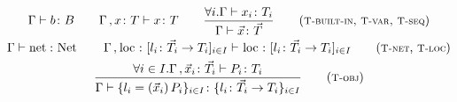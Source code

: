 \begin{myfigure}
  \begin{gather*}
    \Gamma \type b \colon B
    \qquad
    \Gamma \disj x \colon T \type x \colon T
    \qquad
    \frac{
      \forall i. \Gamma \type x_i \colon T_i
    }
    {
      \Gamma \type \vec x \colon \vec T
    }
    \tag{\Tbin, 
      \TVvar, \TVseq}
    \\[\rulespace]
    \Gamma \type \netk \colon \netTypek
    \qquad
    \Gamma \disj \lock \colon \senObjd \type \lock \colon \senObjd
    \tag{\Tnet, \Tloc}
    \\[\rulespace]
    \frac{
      \forall i \in I.\Gamma \disj \vec x_i \colon \vec T_i \type P_i \colon T_i
    }
    {
      \Gamma \type \moduled \colon \objd
   }
   \tag{\Tobj}
 \end{gather*}
 \\[-0.4cm]
\caption{Typing rules 
  for values.}
\label{fig:type-system-values}
\end{myfigure}


